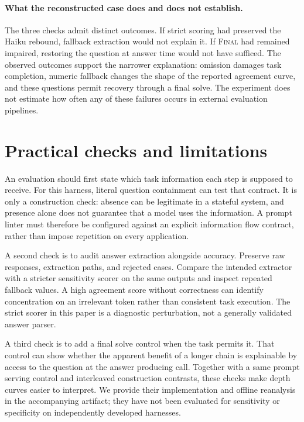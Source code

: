 \documentclass{article}
\newcommand{\finalonly}{\textsc{Final}}
\begin{document}


\paragraph{What the reconstructed case does and does not establish.}
The three checks admit distinct outcomes. If strict scoring had preserved the Haiku rebound, fallback extraction would not explain it. If \finalonly{} had remained impaired, restoring the question at answer time would not have sufficed. The observed outcomes support the narrower explanation: omission damages task completion, numeric fallback changes the shape of the reported agreement curve, and these questions permit recovery through a final solve. The experiment does not estimate how often any of these failures occurs in external evaluation pipelines.

\section{Practical checks and limitations}
\label{sec:discussion}
An evaluation should first state which task information each step is supposed to receive. For this harness, literal question containment can test that contract. It is only a construction check: absence can be legitimate in a stateful system, and presence alone does not guarantee that a model uses the information. A prompt linter must therefore be configured against an explicit information flow contract, rather than impose repetition on every application.

A second check is to audit answer extraction alongside accuracy. Preserve raw responses, extraction paths, and rejected cases. Compare the intended extractor with a stricter sensitivity scorer on the same outputs and inspect repeated fallback values. A high agreement score without correctness can identify concentration on an irrelevant token rather than consistent task execution. The strict scorer in this paper is a diagnostic perturbation, not a generally validated answer parser.

A third check is to add a final solve control when the task permits it. That control can show whether the apparent benefit of a longer chain is explainable by access to the question at the answer producing call. Together with a same prompt serving control and interleaved construction contrasts, these checks make depth curves easier to interpret. We provide their implementation and offline reanalysis in the accompanying artifact; they have not been evaluated for sensitivity or specificity on independently developed harnesses.
\end{document}
